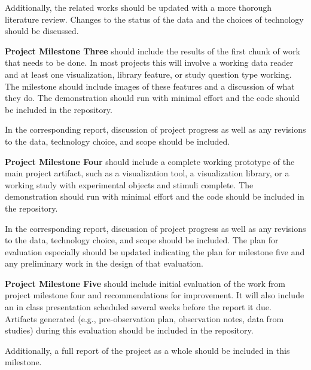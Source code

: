 Additionally, the related works should be updated with a more thorough
literature review. Changes to the status of the data and the choices of
technology should be discussed.

\vspace{1.5ex}\noindent\textbf{Project Milestone Three} should include the
results of the first chunk of work that needs to be done. In most projects
this will involve a working data reader and at least one visualization,
library feature, or study question type working. The milestone should include
images of these features and a discussion of what they do. The demonstration
should run with minimal effort and the code should be included in the
repository.

In the corresponding report, discussion of project progress as well as any
revisions to the data, technology choice, and scope should be included.

\vspace{1.5ex}\noindent\textbf{Project Milestone Four} should include a
complete working prototype of the main project artifact, such as a
visualization tool, a visualization library, or a working study with
experimental objects and stimuli complete. The demonstration should run with
minimal effort and the code should be included in the repository.

In the corresponding report, discussion of project progress as well as any
revisions to the data, technology choice, and scope should be included. The
plan for evaluation especially should be updated indicating the plan for
milestone five and any preliminary work in the design of that evaluation.


\vspace{1.5ex}\noindent\textbf{Project Milestone Five} should include initial
evaluation of the work from project milestone four and recommendations for
improvement. It will also include an in class presentation scheduled several
weeks before the report it due. Artifacts generated (e.g., pre-observation
plan, observation notes, data from studies) during this evaluation should be
included in the repository.

Additionally, a full report of the project as a whole should be included in
this milestone.



